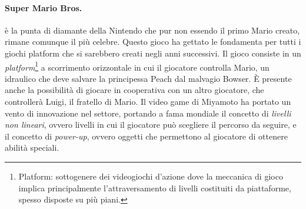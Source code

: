         \paragraph{Super Mario Bros.} è la punta di diamante della Nintendo che pur non essendo il primo Mario creato, rimane comunque il più celebre. Questo gioco ha gettato le fondamenta
            per tutti i giochi platform che si sarebbero creati negli anni successivi. Il gioco consiste in un \textit{platform}\footnote{Platform: sottogenere dei videogiochi d'azione
            dove la meccanica di gioco implica principalmente l'attraversamento di livelli costituiti da piattaforme, spesso disposte su più piani.} a scorrimento orizzontale in cui 
            il giocatore controlla Mario, un idraulico che deve salvare la principessa Peach dal malvagio Bowser. È presente anche la possibilità di giocare in cooperativa con un altro 
            giocatore, che controllerà Luigi, il fratello di Mario. Il video game di Miyamoto ha portato un vento di innovazione nel settore, portando a fama mondiale il concetto
            di \textit{livelli non lineari}, ovvero livelli in cui il giocatore può scegliere il percorso da seguire, e il concetto di \textit{power-up}, ovvero oggetti che 
            permettono al giocatore di ottenere abilità speciali\cite{ryan2011}.
            
